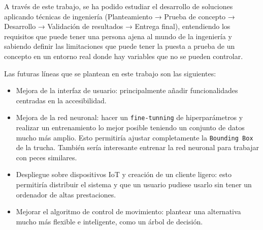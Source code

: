A través de este trabajo, se ha podido estudiar el desarrollo de soluciones aplicando técnicas de ingeniería (Planteamiento → Prueba de concepto → Desarrollo → Validación de resultados → Entrega final), entendiendo 
los requisitos que puede tener una persona ajena al mundo de la ingeniería y sabiendo definir las limitaciones que puede tener la puesta a prueba de un concepto en un entorno real donde hay variables que no se 
pueden controlar.

\vspace{2\baselineskip}

Las futuras líneas que se plantean en este trabajo son las siguientes:
\begin{itemize}
    \item Mejora de la interfaz de usuario: principalmente añadir funcionalidades centradas en la accesibilidad.
    \item Mejora de la red neuronal: hacer un \texttt{fine-tunning} de hiperparámetros y realizar un entrenamiento lo mejor posible teniendo un conjunto de datos mucho más amplio. Esto permitiría ajustar completamente la 
    \texttt{Bounding Box} de la trucha. También sería interesante entrenar la red neuronal para trabajar con peces similares.
    \item Despliegue sobre dispositivos IoT y creación de un cliente ligero: esto permitiría distribuir el sistema y que un usuario pudiese usarlo sin tener un ordenador de altas prestaciones.
    \item Mejorar el algoritmo de control de movimiento: plantear una alternativa mucho más flexible e inteligente, como un árbol de decisión.
\end{itemize}